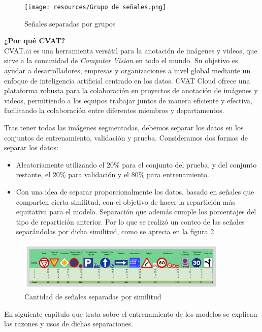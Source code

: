 \documentclass{article}
\begin{document}
\begin{figure}[h]
\centering
\texttt{[image: resources/Grupo de señales.png]}
\caption{Señales separadas por grupos}
\label{fig:Grupos}
\end{figure}

\begin{tcolorbox}
\textbf{¿Por qué CVAT?}\\
CVAT.ai es una herramienta versátil para la anotación de imágenes y videos, que sirve a la comunidad de \textit{Computer Vision} en todo el mundo. Su objetivo es ayudar a desarrolladores, empresas y organizaciones a nivel global mediante un enfoque de inteligencia artificial centrado en los datos. CVAT Cloud ofrece una plataforma robusta para la colaboración en proyectos de anotación de imágenes y videos, permitiendo a los equipos trabajar juntos de manera eficiente y efectiva, facilitando la colaboración entre diferentes miembros y departamentos.
\end{tcolorbox}

Tras tener todas las imágenes segmentadas, debemos separar los datos en los conjuntos de entrenamiento, validación y prueba. Consideramos dos formas de separar los datos:

\begin{itemize}
\item{Aleatoriamente utilizando el $20\%$ para el conjunto del prueba, y del conjunto restante, el $20\%$ para validación y el $80\%$ para entrenamiento.}
\item{Con una idea de separar proporcionalmente los datos, basado en señales que comparten cierta similitud, con el objetivo de hacer la repartición más equitativa para el modelo. Separación que además cumple los porcentajes del tipo de repartición anterior. Por lo que se realizó un conteo de las señales separándolas por dicha similitud, como se aprecia en la figura \ref{fig:sign count}}
\end{itemize}
\begin{figure}[h]
\centering
\includegraphics[width=0.9\textwidth]{resources/sign count.png}
\caption{Cantidad de señales separadas por similitud}
\label{fig:sign count}
\end{figure}
En siguiente capítulo que trata sobre el entrenamiento de los modelos se explican las razones y usos de dichas separaciones.
\end{document}
